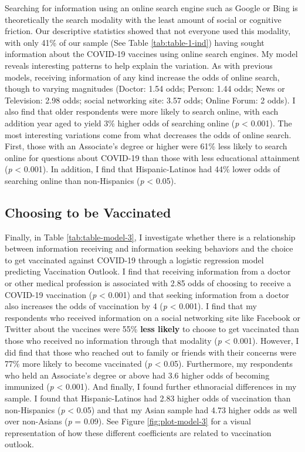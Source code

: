 Searching for information using an online search engine such as Google or Bing
is theoretically the search modality with the least amount of social or cognitive
friction. Our descriptive statistics showed that not everyone used this modality,
with only 41\% of our sample (See Table \ref{tab:table-1-ind}) having sought
information about the COVID-19 vaccines using online search engines. My model
reveals interesting patterns to help explain the variation. As with previous
models, receiving information of any kind increase the odds of online search,
though to varying magnitudes (Doctor: 1.54 odds; Person: 1.44 odds; 
News or Television: 2.98 odds; 
social networking site: 3.57 odds; Online Forum: 2 odds). I also find that older respondents
were more likely to search online, with each addition year aged to yield 3\%
higher odds of searching online (\emph{p} \textless{} 0.001). The most interesting variations
come from what decreases the odds of online search. First, those with an
Associate's degree or higher were 61\%
less likely to search online for questions about COVID-19 than those with less
educational attainment (\emph{p} \textless{} 0.001). In addition, I find that Hispanic-Latinos
had 44\% lower odds of searching online than non-Hispanics (\emph{p} \textless{} 0.05).

\hypertarget{vaccination-views}{%
\subsection{Choosing to be Vaccinated}\label{vaccination-views}}



Finally, in Table \ref{tab:table-model-3}, I investigate whether there is a
relationship between information receiving and information seeking behaviors and
the choice to get vaccinated against COVID-19 through a logistic regression
model predicting Vaccination Outlook. I find that receiving information from a
doctor or other medical profession is associated with 2.85 odds of choosing
to receive a COVID-19 vaccination (\emph{p} \textless{} 0.001) and that seeking 
information from a doctor also increases the odds of vaccination by 4 (\emph{p} \textless{} 0.001).
I find that my respondents who received information on a social networking site
like Facebook or Twitter about the vaccines were 55\%
\textbf{less likely} to choose to get vaccinated than those who received no information through
that modality (\emph{p} \textless{} 0.001). However, I did find that those who reached out to
family or friends with their concerns were 77\% more likely to become vaccinated 
(\emph{p} \textless{} 0.05). Furthermore, my respondents who held an Associate's degree
or above had 3.6 higher odds of becoming immunized (\emph{p} \textless{} 0.001).
And finally, I found further ethnoracial differences in my sample. I found that
Hispanic-Latinos had 2.83 higher odds of vaccination than non-Hispanics
(\emph{p} \textless{} 0.05) and that my Asian sample had 4.73 higher odds as well over
non-Asians (\emph{p}  = 0.09). See Figure \ref{fig:plot-model-3} for a visual
representation of how these different coefficients are related to vaccination outlook.

